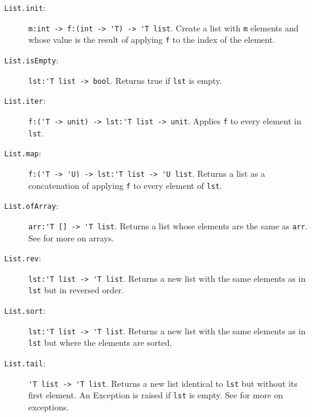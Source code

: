 \begin{description}
\item[\texttt{List.init}:] \lstinline{m:int -> f:(int -> 'T) -> 'T list}. Create a list with \lstinline{m} elements and whose value is the result of applying \lstinline{f} to the index of the element.
\item[\texttt{List.isEmpty}:]  \lstinline{lst:'T list -> bool}. Returns true if \lstinline{lst} is empty.
\item[\texttt{List.iter}:] \lstinline{f:('T -> unit) -> lst:'T list -> unit}. Applies \lstinline{f} to every element in \lstinline{lst}.
\item[\texttt{List.map}:] \lstinline{f:('T -> 'U) -> lst:'T list -> 'U list}. Returns a list as a concatenation of applying \lstinline{f} to every element of \lstinline{lst}.
\item[\texttt{List.ofArray}:] \lstinline{arr:'T [] -> 'T list}. Returns a list whose elements are the same as \lstinline{arr}. See  for more on arrays.
\item[\texttt{List.rev}:] \lstinline{lst:'T list -> 'T list}. Returns a new list with the same elements as in \lstinline{lst} but in reversed order.
\item[\texttt{List.sort}:] \lstinline{lst:'T list -> 'T list}. Returns a new list with the same elements as in \lstinline{lst} but where the elements are sorted.
\item[\texttt{List.tail}:]  \lstinline{'T list -> 'T list}. Returns a new list identical to \lstinline{lst} but without its first element. An Exception is raised if \lstinline{lst} is empty.  See  for more on exceptions.

\end{description}
